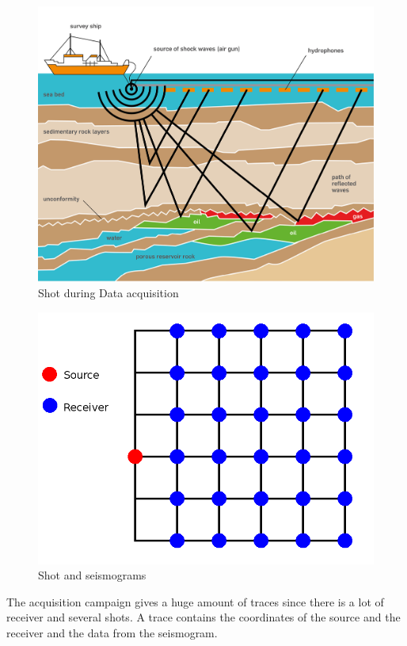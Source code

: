 \begin{figure}[H]
	\centering
	\includegraphics[scale=0.75]{oss}
	\caption{Shot during Data acquisition \label{fig:shot}}
\end{figure}
\begin{figure}[H]
	\centering
	\includegraphics[scale=0.37]{gridSR}
	\caption{Shot and seismograms \label{fig:source-receiver}}
\end{figure}

The acquisition campaign gives a huge amount of traces since there is a lot of receiver and several shots.
A trace contains the coordinates of the source and the receiver and the data from the seismogram.

